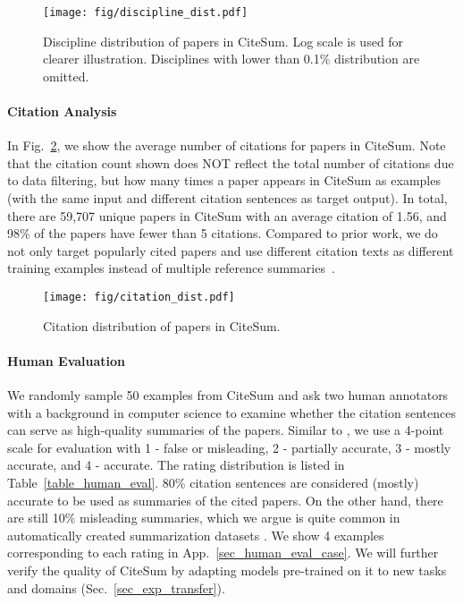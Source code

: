 \documentclass[11pt]{article}
\newcommand{\upv}{\vspace{-.0cm}}
\newcommand{\downv}{\vspace{-.1cm}}
\newcommand{\ourdata}{CiteSum\xspace}
\begin{document}
\begin{figure}[t]
    \texttt{[image: fig/discipline\_dist.pdf]}
    \vspace{-0.35cm}
    \upv
    \caption{Discipline distribution of papers in \ourdata. Log scale is used for clearer illustration. Disciplines with lower than 0.1\% distribution are omitted.}
    \label{fig_discipline_dist}
    \downv
\end{figure}

\paragraph{Citation Analysis}
In Fig.~\ref{fig_citation_dist}, we show the average number of citations for papers in \ourdata.
Note that the citation count shown does NOT reflect the total number of citations due to data filtering, but how many times a paper appears in \ourdata as examples (with the same input and different citation sentences as target output).
In total, there are 59,707 unique papers in \ourdata with an average citation of 1.56, and 98\% of the papers have fewer than 5 citations.
Compared to prior work, we do not only target popularly cited papers \cite{yasunaga2019scisummnet} and use different citation texts as different training examples instead of multiple reference summaries~\cite{cachola-etal-2020-tldr}.

\begin{figure}[t]
    \texttt{[image: fig/citation\_dist.pdf]}
    \vspace{-0.35cm}
    \upv
    \caption{Citation distribution of papers in \ourdata.}
    \label{fig_citation_dist}
    \downv
\end{figure}


\paragraph{Human Evaluation}
We randomly sample 50 examples from \ourdata and ask two human annotators with a background in computer science to examine whether the citation sentences can serve as high-quality summaries of the papers.
Similar to \citet{cachola-etal-2020-tldr}, we use a 4-point scale for evaluation with 1 - false or misleading, 2 - partially accurate, 3 - mostly accurate, and 4 - accurate.
The rating distribution is listed in Table~\ref{table_human_eval}.
80\% citation sentences are considered (mostly) accurate to be used as summaries of the cited papers.
On the other hand, there are still 10\% misleading summaries, which we argue is quite common in automatically created summarization datasets \cite{mao-etal-2020-facet}.
We show 4 examples corresponding to each rating in App.~\ref{sec_human_eval_case}.
We will further verify the quality of \ourdata by adapting models pre-trained on it to new tasks and domains (Sec.~\ref{sec_exp_transfer}).
\end{document}
